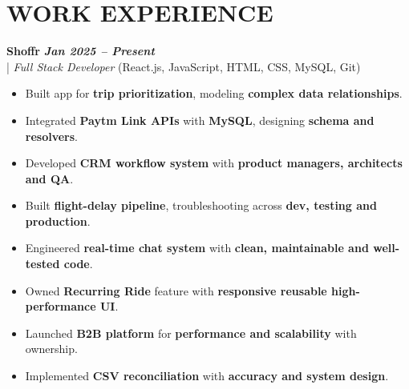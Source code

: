 \documentclass[10pt,a4paper]{article}
\begin{document}
\section*{WORK EXPERIENCE}
\small

\noindent
  \textbf{Shoffr} \hfill \textit{\textbf{Jan 2025 -- Present}} \\
  \;|\;
  \textit{Full Stack Developer} (React.js, JavaScript, HTML, CSS, MySQL, Git)
\begin{itemize}



\item Built app for \textbf{trip prioritization}, modeling \textbf{complex data relationships}.



\item Integrated \textbf{Paytm Link APIs} with \textbf{MySQL}, designing \textbf{schema and resolvers}.



\item Developed \textbf{CRM workflow system} with \textbf{product managers, architects and QA}.



\item Built \textbf{flight-delay pipeline}, troubleshooting across \textbf{dev, testing and production}.



\item Engineered \textbf{real-time chat system} with \textbf{clean, maintainable and well-tested code}.



\item Owned \textbf{Recurring Ride} feature with \textbf{responsive reusable high-performance UI}.



\item Launched \textbf{B2B platform} for \textbf{performance and scalability} with ownership.



\item Implemented \textbf{CSV reconciliation} with \textbf{accuracy and system design}.



\end{itemize}
\end{document}
